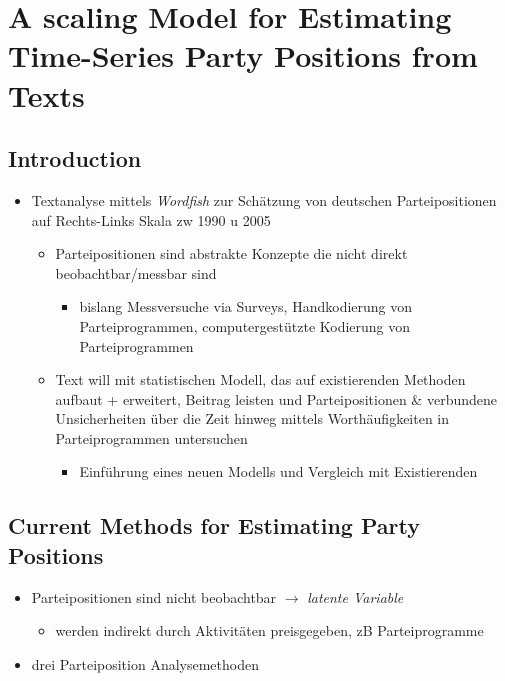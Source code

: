 \documentclass[11pt]{article}
\date{\today}
\title{}
\begin{document}
\tableofcontents

\section{A scaling Model for Estimating Time-Series Party Positions from Texts}
\label{sec:org509b83b}
\subsection{Introduction}
\label{sec:orgaeffe85}
\begin{itemize}
\item Textanalyse mittels \emph{Wordfish} zur Schätzung von deutschen Parteipositionen auf Rechts-Links Skala zw 1990 u 2005
\begin{itemize}
\item Parteipositionen sind abstrakte Konzepte die nicht direkt beobachtbar/messbar sind
\begin{itemize}
\item bislang Messversuche via Surveys, Handkodierung von Parteiprogrammen, computergestützte Kodierung von Parteiprogrammen
\end{itemize}
\item Text will mit statistischen Modell, das auf existierenden Methoden aufbaut + erweitert, Beitrag leisten und Parteipositionen \& verbundene Unsicherheiten über die Zeit hinweg mittels Worthäufigkeiten in Parteiprogrammen untersuchen
\begin{itemize}
\item Einführung eines neuen Modells und Vergleich mit Existierenden
\end{itemize}
\end{itemize}
\end{itemize}
\subsection{Current Methods for Estimating Party Positions}
\label{sec:org3f5d15f}
\begin{itemize}
\item Parteipositionen sind nicht beobachtbar \(\rightarrow\) \emph{latente Variable}
\begin{itemize}
\item werden indirekt durch Aktivitäten preisgegeben, zB Parteiprogramme
\end{itemize}
\item drei Parteiposition Analysemethoden
\end{itemize}
\end{document}
